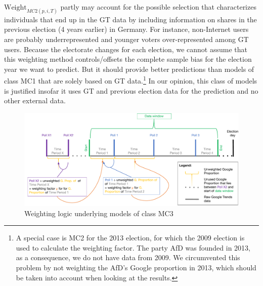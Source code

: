 \documentclass[
  letterpaper,
  DIV=11,
  numbers=noendperiod]{scrartcl}
\begin{document}
\(\text{Weight}_{MC2(p,i,T)}\) partly may account for the possible
selection that characterizes individuals that end up in the GT data by
including information on shares in the previous election (4 years
earlier) in Germany. For instance, non-Internet users are probably
underrepresented and younger voters over-represented among GT users.
Because the electorate changes for each election, we cannot assume that
this weighting method controls/offsets the complete sample bias for the
election year we want to predict. But it should provide better
predictions than models of class MC1 that are solely based on GT
data.\footnote{A special case is MC2 for the 2013 election, for which
  the 2009 election is used to calculate the weighting factor. The party
  AfD was founded in 2013, as a consequence, we do not have data from
  2009. We circumvented this problem by not weighting the AfD's Google
  proportion in 2013, which should be taken into account when looking at
  the results.} In our opinion, this class of models is justified
insofar it uses GT and previous election data for the prediction and no
other external data.

\begin{figure}[h]

\caption{\label{fig-3}Weighting logic underlying models of class MC3}

{\centering \includegraphics{Figure_3_weighting_logic.pdf}

}

\end{figure}
\end{document}
